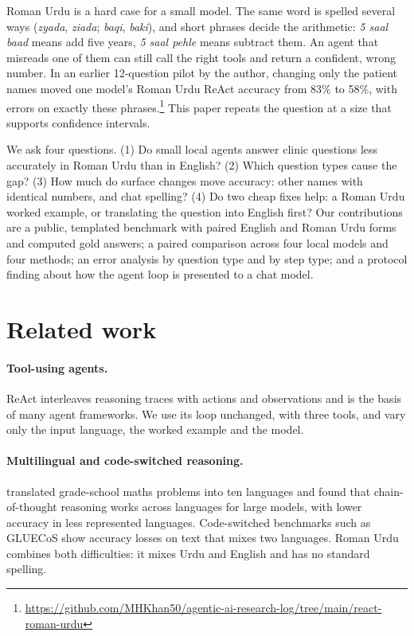 \documentclass[11pt]{article}
\begin{document}
Roman Urdu is a hard case for a small model. The same word is spelled several ways (\emph{zyada}, \emph{ziada}; \emph{baqi}, \emph{baki}), and short phrases decide the arithmetic: \emph{5 saal baad} means add five years, \emph{5 saal pehle} means subtract them. An agent that misreads one of them can still call the right tools and return a confident, wrong number. In an earlier 12-question pilot by the author, changing only the patient names moved one model's Roman Urdu ReAct accuracy from 83\% to 58\%, with errors on exactly these phrases.\footnote{\url{https://github.com/MHKhan50/agentic-ai-research-log/tree/main/react-roman-urdu}} This paper repeats the question at a size that supports confidence intervals.

We ask four questions. (1) Do small local agents answer clinic questions less accurately in Roman Urdu than in English? (2) Which question types cause the gap? (3) How much do surface changes move accuracy: other names with identical numbers, and chat spelling? (4) Do two cheap fixes help: a Roman Urdu worked example, or translating the question into English first? Our contributions are a public, templated benchmark with paired English and Roman Urdu forms and computed gold answers; a paired comparison across four local models and four methods; an error analysis by question type and by step type; and a protocol finding about how the agent loop is presented to a chat model.

\section{Related work}
\paragraph{Tool-using agents.} ReAct \citep{yao2023react} interleaves reasoning traces with actions and observations and is the basis of many agent frameworks. We use its loop unchanged, with three tools, and vary only the input language, the worked example and the model.

\paragraph{Multilingual and code-switched reasoning.} \citet{shi2023mgsm} translated grade-school maths problems into ten languages and found that chain-of-thought reasoning works across languages for large models, with lower accuracy in less represented languages. Code-switched benchmarks such as GLUECoS \citep{khanuja2020gluecos} show accuracy losses on text that mixes two languages. Roman Urdu combines both difficulties: it mixes Urdu and English and has no standard spelling.
\end{document}
